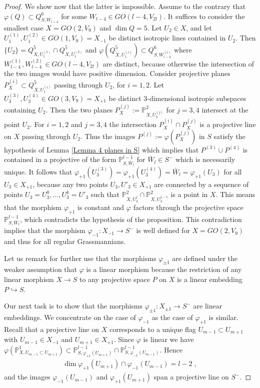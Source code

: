 \documentclass[12pt]{amsart}
\def\PP {{\mathbb P}}     %
\def\hw  {\hookrightarrow}
\begin{document}
\begin{proof}
We show now that the latter is impossible. Assume to the contrary that $\varphi(Q)\subset Q^6_{S,W_{l-4}}$ for some $W_{l-4}\in GO(l-4,V_{2l})$. It suffices to consider the smallest case $X=GO(2,V_9)$ and $\dim Q=5$. Let $U_2\in X$, and let $U_1^{(1)},U_1^{(2)}\in GO(1,V_9)= X_{-1}$ be distinct isotropic lines contained in $U_2$. Then $\{U_2\}=Q^5_{X,U^{(1)}_1}\cap Q^{5}_{X,U^{(2)}_1}$ and $\varphi(Q^{5}_{X,U^{(i)}_1})\subset Q^6_{S,W^{(i)}_{l-4}}$ where $W^{(1)}_{l-4},W^{(2)}_{l-4}\in GO(l-4,V_{2l})$ are distinct, because otherwise the intersection of the two images would have positive dimension. Consider projective planes $P_X^{(i)}\subset Q^5_{X,U^{(i)}_1}$ passing through $U_2$, for $i=1,2$. Let $U_3^{(3)},U_3^{(4)}\in GO(3,V_9)=X_{+1}$ be distinct 3-dimensional isotropic subspaces containing $U_2$. Then the two planes $P_X^{(j)}:=\PP^2_{X,U_3^{(j)}}$ for $j=3,4$ intersect at the point $U_2$. For $i=1,2$ and $j=3,4$ the intersection $P_X^{(i)}\cap P_X^{(j)}$ is a projective line on $X$ passing through $U_2$. Thus the images $P^{(j)}:=\varphi(P_X^{(j)})$ in $S$ satisfy the hypothesis of Lemma \ref{Lemma 4 planes in S} which implies that $P^{(3)}\cup P^{(4)}$ is contained in a projective of the form $\PP^{l-1}_{S,\bar W_l}$ for $\bar W_{l}\in S^-$ which is necessarily unique. It follows that $\varphi_{+1}(U_3^{(3)})=\varphi_{+1}(U_3^{(4)})=\bar W_l=\varphi_{+1}(U_3)$ for all $U_3\in X_{+1}$, because any two points $U_3,U'_3\in X_{+1}$ are connected by a sequence of points $U_3=U_3^0,...,U_3^k=U'_3$ such that $\PP^2_{X,U_3^j}\cap \PP^2_{X,U_3^{j-1}}$ is a point in $X$. This means that the morphism $\varphi_{+1}$ is constant and $\varphi$ factors through the projective space $\PP^{l-1}_{S,\bar W_l}$, which contradicts the hypothesis of the proposition. This contradiction implies that the morphism $\varphi_{-1}:X_{-1}\to S^-$ is well defined for $X=GO(2,V_9)$ and thus for all regular Grassmannians.


Let us remark for further use that the morphisms $\varphi_{\pm1}$ are defined under the weaker assumption that $\varphi$ is a linear morphism because the restriction of any linear morphism $X\to S$ to any projective space $P$ on $X$ is a linear embedding $P\hw S$.


Our next task is to show that the morphisms $\varphi_{\pm1}:X_{\pm 1}\to S^{-}$ are linear embeddings. We concentrate on the case of $\varphi_{-1}$ as the case of $\varphi_{+1}$ is similar. Recall that a projective line on $X$ corresponds to a unique flag $U_{m-1}\subset U_{m+1}$ with $U_{m-1}\in X_{-1}$ and $U_{m+1}\in X_{+1}$. Since $\varphi$ is linear we have $\varphi(\PP^1_{X,U_{m-1}\subset U_{m+1}})\subset \PP^{l-1}_{S,\varphi_{+1}(U_{m+1})}\cap \PP^{l-1}_{S,\varphi_{-1}(U_{m-1})}$.
Hence 
\begin{gather}\label{For phi plus cap phi minus}
\dim \varphi_{+1}(U_{m+1})\cap \varphi_{-1}(U_{m-1}) = l-2 \;,
\end{gather}
and the images $\varphi_{-1}(U_{m-1})$ and $\varphi_{+1}(U_{m+1})$ span a projective line on $S^{-}$.


\end{proof}
\end{document}
